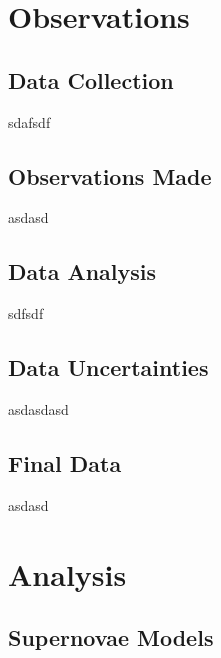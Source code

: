 \documentclass[twocolumn]{revtex4}
\begin{document}
\vspace{-3ex}
\section{Observations} 
\vspace{-2ex}
\subsection{Data Collection}
\vspace{-2ex}

sdafsdf

\vspace{-3ex}
\subsection{Observations Made}
\vspace{-2ex}

asdasd

\vspace{-3ex}
\subsection{Data Analysis}
\vspace{-2ex}

sdfsdf

\vspace{-3ex}
\subsection{Data Uncertainties}
\vspace{-2ex}

asdasdasd

\vspace{-3ex}
\subsection{Final Data}
\vspace{-2ex}

asdasd

\vspace{-3ex}
\section{Analysis}
\vspace{-2ex}
\subsection{Supernovae Models}
\vspace{-2ex}
\end{document}
